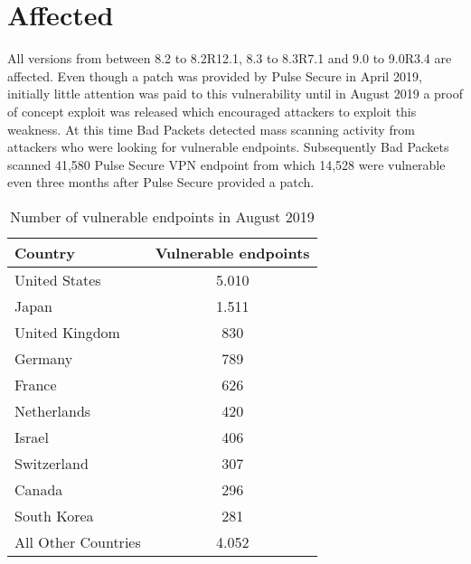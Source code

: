 \section{Affected}
\label{affected}
All versions from between 8.2 to 8.2R12.1, 8.3 to 8.3R7.1 and 9.0 to 9.0R3.4 are affected. \autocite{NVDCVE:online}
Even though a patch was provided by Pulse Secure in April 2019, initially little attention was paid to this vulnerability until in August 2019 a proof of concept exploit was released which encouraged attackers to exploit this weakness. \autocite{Tenable1:online} At this time Bad Packets detected mass scanning activity from attackers who were looking for vulnerable endpoints. Subsequently Bad Packets scanned 41,580 Pulse Secure VPN endpoint from which 14,528 were vulnerable even three months after Pulse Secure provided a patch. \autocite{BadPackets:online}

\begin{center}
    \begin{table}[htbp]
        \begin{tabularx}{\linewidth}{lc}
            \toprule
            \textbf{Country}        & \textbf{Vulnerable endpoints} \\
            \toprule
            United States           & 5.010 \\ %
            Japan                   & 1.511 \\ %
            United Kingdom          & 830   \\ %
            Germany                 & 789   \\ %
            France                  & 626   \\ %
            Netherlands             & 420   \\ %
            Israel                  & 406   \\ %
            Switzerland             & 307   \\ %
            Canada                  & 296   \\ %
            South Korea             & 281   \\ %
            All Other Countries     & 4.052 \\ \bottomrule
        \end{tabularx}
        \caption{Number of vulnerable endpoints in August 2019 \autocite{BadPackets:online}}
    \end{table}
\end{center}

